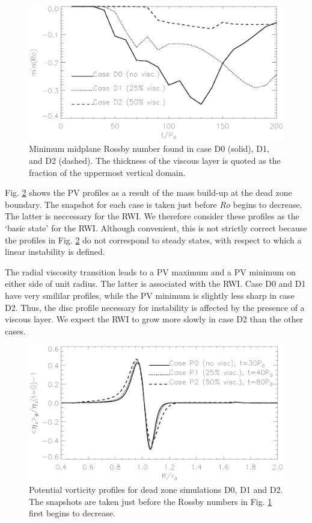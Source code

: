 \begin{figure}
  \centering
  \includegraphics[width=\linewidth]{figures/rtrans_nuamp10_minrossby}
  \caption{Minimum midplane Rossby number found in case D0 (solid),
    D1, and D2 (dashed). The thickness of the viscous layer is quoted
    as the fraction of the uppermost vertical domain. 
    \label{rtrans_nuamp10_minrossby}}
\end{figure}

Fig. \ref{rtrans_nuamp10_vorten1d} shows the PV profiles as a result
of the mass build-up at the dead zone boundary. The snapshot for each
case is taken just before $Ro$ begins to decrease. 
The latter is neccessary for the RWI. We
therefore consider these profiles as the `basic state' for the
RWI. Although convenient, this is not strictly correct because the
profiles in Fig. \ref{rtrans_nuamp10_vorten1d} do not correspond to
steady states, with respect to which a linear instability is defined.   

The radial viscosity transition leads to a PV maximum and a PV minimum
on either side of unit radius. The latter is associated with the RWI. 
Case D0 and D1 have very smililar profiles, while the PV minimum is
slightly less sharp in case D2. Thus, the disc profile necessary for
instability is affected by the presence of a viscous layer. We expect
the RWI to grow more slowly in case D2 than the other cases. 

\begin{figure}
  \centering
  \includegraphics[width=\linewidth]{figures/rtrans_nuamp10_vorten1d}
  \caption{Potential vorticity profiles for dead zone simulations D0,
    D1 and D2. The snapshots are taken just before the Rossby numbers
    in Fig. \ref{rtrans_nuamp10_minrossby} first begins to decrease. 
    \label{rtrans_nuamp10_vorten1d}}
\end{figure}

